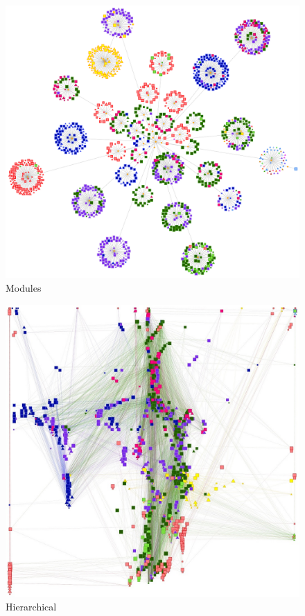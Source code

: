 \begin{figure}[p]
\centering
\includegraphics[height=0.45\textheight]{img/oot/modules}
\caption{Modules}\label{fig:oot:module}
\end{figure}

\begin{figure}[p]
\centering
\includegraphics[height=0.45\textheight]{img/oot/hierarchical}
\caption{Hierarchical}\label{fig:oot:hier}
\end{figure}

